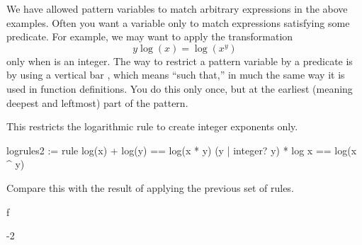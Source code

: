 {We have allowed pattern variables to match arbitrary expressions in the
above examples.
Often you want a variable only to match expressions
satisfying some predicate.
For example, we may want to apply the transformation
\begin{displaymath}
y \log(x) = \log(x^y)
\end{displaymath}
only when  is an integer.
%
The way to restrict a pattern variable  by a predicate 
is by using a vertical bar \spadSyntax{|}, which means ``such that,'' in
much the same way it is used in function definitions.
You do this only once, but at the earliest
(meaning deepest and leftmost) part of the pattern.
\begin{xtc}
\begin{xtccomment}
This restricts the logarithmic rule to create integer exponents only.
\end{xtccomment}
\begin{spadsrc}
logrules2 := rule
  log(x) + log(y)          == log(x * y)
  (y | integer? y) * log x == log(x ^ y)
\end{spadsrc}
\begin{TeXOutput}
\begin{fricasmath}{7}
%
\end{fricasmath}
\end{TeXOutput}
\end{xtc}
\begin{xtc}
\begin{xtccomment}
Compare this with the result of applying the previous set of rules.
\end{xtccomment}
\begin{spadsrc}
f 
\end{spadsrc}
\begin{TeXOutput}
\begin{fricasmath}{8}
\TIMES {}-{2\TIMES {}}%
\end{fricasmath}
\end{TeXOutput}
\end{xtc}
\begin{xtc}

\end{xtc}}

